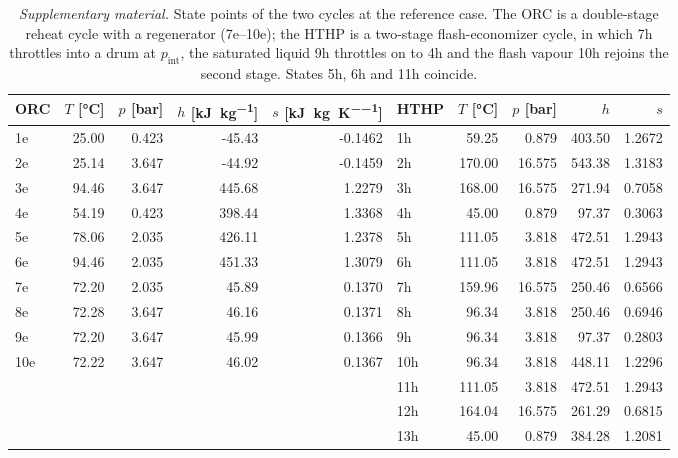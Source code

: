 \begin{table}[htbp]
\centering
\caption{\emph{Supplementary material.} State points of the two cycles at the reference case. The ORC is a double-stage reheat cycle with a regenerator (7e--10e); the HTHP is a two-stage flash-economizer cycle, in which 7h throttles into a drum at $p_\mathrm{int}$, the saturated liquid 9h throttles on to 4h and the flash vapour 10h rejoins the second stage. States 5h, 6h and 11h coincide.}
\label{tab:states}
\small
\begin{tabular}{@{}l r r r r | l r r r r@{}}
\toprule
ORC & $T$ [\si{\celsius}] & $p$ [\si{\bar}] & $h$ [\si{\kilo\joule\per\kilogram}] & $s$ [\si{\kilo\joule\per\kilogram\per\kelvin}] & HTHP & $T$ [\si{\celsius}] & $p$ [\si{\bar}] & $h$ & $s$ \\
\midrule
1e & 25.00 & 0.423 & -45.43 & -0.1462 & 1h & 59.25 & 0.879 & 403.50 & 1.2672 \\
2e & 25.14 & 3.647 & -44.92 & -0.1459 & 2h & 170.00 & 16.575 & 543.38 & 1.3183 \\
3e & 94.46 & 3.647 & 445.68 & 1.2279 & 3h & 168.00 & 16.575 & 271.94 & 0.7058 \\
4e & 54.19 & 0.423 & 398.44 & 1.3368 & 4h & 45.00 & 0.879 & 97.37 & 0.3063 \\
5e & 78.06 & 2.035 & 426.11 & 1.2378 & 5h & 111.05 & 3.818 & 472.51 & 1.2943 \\
6e & 94.46 & 2.035 & 451.33 & 1.3079 & 6h & 111.05 & 3.818 & 472.51 & 1.2943 \\
7e & 72.20 & 2.035 & 45.89 & 0.1370 & 7h & 159.96 & 16.575 & 250.46 & 0.6566 \\
8e & 72.28 & 3.647 & 46.16 & 0.1371 & 8h & 96.34 & 3.818 & 250.46 & 0.6946 \\
9e & 72.20 & 3.647 & 45.99 & 0.1366 & 9h & 96.34 & 3.818 & 97.37 & 0.2803 \\
10e & 72.22 & 3.647 & 46.02 & 0.1367 & 10h & 96.34 & 3.818 & 448.11 & 1.2296 \\
 & & & &  & 11h & 111.05 & 3.818 & 472.51 & 1.2943 \\
 & & & &  & 12h & 164.04 & 16.575 & 261.29 & 0.6815 \\
 & & & &  & 13h & 45.00 & 0.879 & 384.28 & 1.2081 \\
\bottomrule
\end{tabular}
\end{table}
